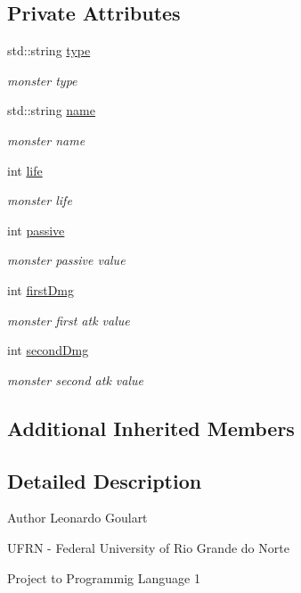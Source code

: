 \subsection*{Private Attributes}
\begin{DoxyCompactItemize}
\item 
std\+::string \hyperlink{classMonsterType_a8f50399e55fb9de06c7a316bf3564cc3}{type}
\begin{DoxyCompactList}\small\item\em monster type \end{DoxyCompactList}\item 
std\+::string \hyperlink{classMonsterType_a7d5203fcca6105cc491d672dadfa2ab5}{name}
\begin{DoxyCompactList}\small\item\em monster name \end{DoxyCompactList}\item 
int \hyperlink{classMonsterType_a7bf9b815774b041af4d5f51ce25ae5c3}{life}
\begin{DoxyCompactList}\small\item\em monster life \end{DoxyCompactList}\item 
int \hyperlink{classMonsterType_a724fe4488d7b1f3e98acc95cd918d48b}{passive}
\begin{DoxyCompactList}\small\item\em monster passive value \end{DoxyCompactList}\item 
int \hyperlink{classMonsterType_af4fb712892776b49285c3c22451a1301}{first\+Dmg}
\begin{DoxyCompactList}\small\item\em monster first atk value \end{DoxyCompactList}\item 
int \hyperlink{classMonsterType_a55aa99c36bbd1d9b9c19bffee306e19b}{second\+Dmg}
\begin{DoxyCompactList}\small\item\em monster second atk value \end{DoxyCompactList}\end{DoxyCompactItemize}
\subsection*{Additional Inherited Members}


\subsection{Detailed Description}
\begin{DoxyAuthor}{Author}
Leonardo Goulart 

U\+F\+RN -\/ Federal University of Rio Grande do Norte 

Project to Programmig Language 1 
\end{DoxyAuthor}


